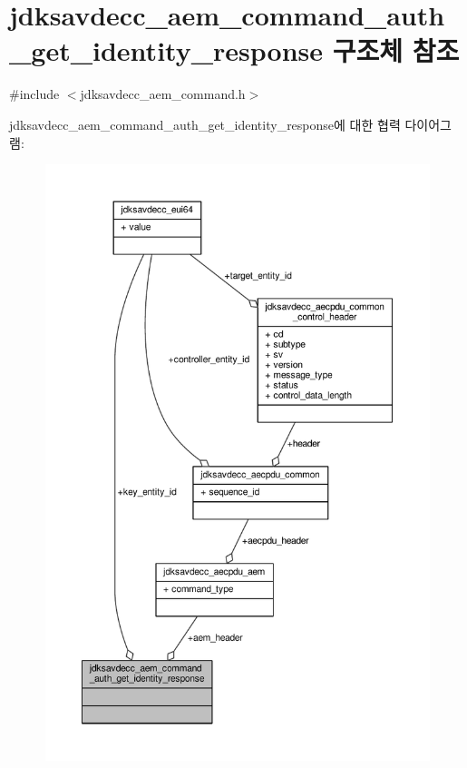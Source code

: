 \hypertarget{structjdksavdecc__aem__command__auth__get__identity__response}{}\section{jdksavdecc\+\_\+aem\+\_\+command\+\_\+auth\+\_\+get\+\_\+identity\+\_\+response 구조체 참조}
\label{structjdksavdecc__aem__command__auth__get__identity__response}


{\ttfamily \#include $<$jdksavdecc\+\_\+aem\+\_\+command.\+h$>$}



jdksavdecc\+\_\+aem\+\_\+command\+\_\+auth\+\_\+get\+\_\+identity\+\_\+response에 대한 협력 다이어그램\+:
\nopagebreak
\begin{figure}[H]
\begin{center}
\leavevmode
\includegraphics[width=350pt]{structjdksavdecc__aem__command__auth__get__identity__response__coll__graph}
\end{center}
\end{figure}
